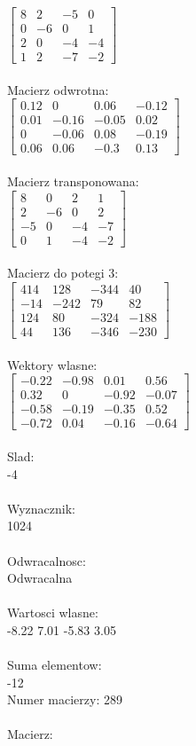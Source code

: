 \documentclass[a4paper,12pt]{article}
\begin{document}
$\begin{bmatrix} 8&2&-5&0\\0&-6&0&1\\2&0&-4&-4\\1&2&-7&-2 \end{bmatrix}$
\\
\\
Macierz odwrotna:\\

$\begin{bmatrix} 0.12&0&0.06&-0.12\\0.01&-0.16&-0.05&0.02\\0&-0.06&0.08&-0.19\\0.06&0.06&-0.3&0.13 \end{bmatrix}$
\\
\\
Macierz transponowana:\\

$\begin{bmatrix} 8&0&2&1\\2&-6&0&2\\-5&0&-4&-7\\0&1&-4&-2 \end{bmatrix}$
\\
\\
Macierz do potegi 3:\\

$\begin{bmatrix} 414&128&-344&40\\-14&-242&79&82\\124&80&-324&-188\\44&136&-346&-230 \end{bmatrix}$
\\
\\
Wektory wlasne:\\

$\begin{bmatrix} -0.22&-0.98&0.01&0.56\\0.32&0&-0.92&-0.07\\-0.58&-0.19&-0.35&0.52\\-0.72&0.04&-0.16&-0.64 \end{bmatrix}$
\\
\\
Slad:\\
-4
\\
\\
Wyznacznik:\\
1024
\\
\\
Odwracalnosc:\\
Odwracalna
\\
\\
Wartosci wlasne:\\
-8.22 7.01 -5.83 3.05
\\
\\
Suma elementow:\\
-12
\\
\newpage
Numer macierzy:
289
\\
\\
Macierz:\\
\end{document}
